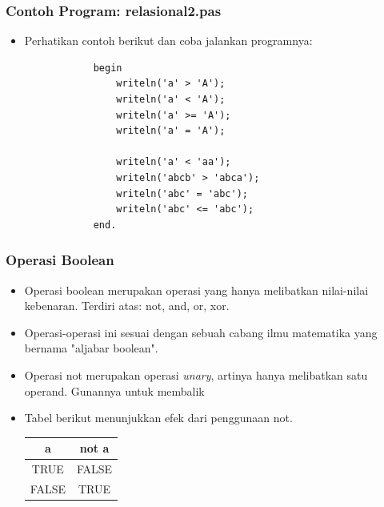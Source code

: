 \documentclass{beamer}
\begin{document}
\begin{frame}[fragile]
\frametitle{Contoh Program: relasional2.pas}
\begin{itemize}
	\item Perhatikan contoh berikut dan coba jalankan programnya:
		\begin{lstlisting}
			begin
			    writeln('a' > 'A');
			    writeln('a' < 'A');
			    writeln('a' >= 'A');
			    writeln('a' = 'A');

			    writeln('a' < 'aa');
			    writeln('abcb' > 'abca');
			    writeln('abc' = 'abc');
			    writeln('abc' <= 'abc');
			end.
		\end{lstlisting}
\end{itemize}
\end{frame}

\begin{frame}
\frametitle{Operasi Boolean}
\begin{itemize}
	\item Operasi boolean merupakan operasi yang hanya melibatkan nilai-nilai kebenaran. Terdiri atas: not, and, or, xor.
	\item Operasi-operasi ini sesuai dengan sebuah cabang ilmu matematika yang bernama "aljabar boolean".
	\item Operasi \alert{not} merupakan operasi \textit{unary}, artinya hanya melibatkan satu operand. Gunannya untuk membalik 
	\item Tabel berikut menunjukkan efek dari penggunaan not.
	\begin{tabular}{|c|c|}
	\hline a & not a \\ 
	\hline TRUE & FALSE \\ 
	\hline FALSE & TRUE \\ 
	\hline 
	\end{tabular} 
\end{itemize}
\end{frame}
\end{document}
